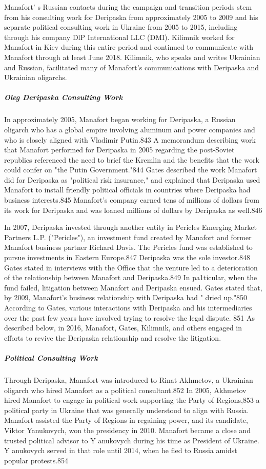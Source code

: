 Manafort' s  Russian contacts during the campaign and transition periods stem from his consulting work for Deripaska from approximately 2005 to 2009 and his separate political consulting work in Ukraine from 2005 to 2015, including through his company Dl\1P International LLC (DMI). Kilimnik worked for Manafort in Kiev during this entire period and continued to communicate with Manafort through at least June 2018. Kilimnik, who speaks and writes Ukrainian and Russian, facilitated many of Manafort's communications with Deripaska and Ukrainian oligarchs.

\subparagraph{Oleg Deripaska Consulting Work}

In approximately 2005, Manafort began working for Deripaska, a  Russian oligarch who has a  global empire involving aluminum and power companies and who is closely aligned with Vladimir Putin.843 A memorandum describing work that Manafort performed for Deripaska in 2005 regarding the post-Soviet republics referenced the need to brief the Kremlin and the benefits that the work could confer on "the Putin Government."844 Gates described the work Manafort did for Deripaska as "political risk insurance," and explained that Deripaska used Manafort to install friendly political officials in countries where Deripaska had business interests.845 Manafort's company earned tens of millions of dollars from its work for Deripaska and was loaned millions of dollars by Deripaska as well.846

In 2007, Deripaska invested through another entity in Pericles Emerging Market Partners L.P. ("Pericles"), an investment fund created by Manafort and former Manafort business partner Richard Davis. The Pericles fund was established to pursue investments in Eastern Europe.847 Deripaska was the sole investor.848 Gates stated in interviews with the Office that the venture led to a deterioration of the relationship between Manafort and Deripaska.849 In pa1ticular, when the fund failed, litigation between Manafort and Deripaska ensued. Gates stated that, by 2009, Manafort's business relationship with Deripaska had " dried up."850 According to Gates, various interactions with Deripaska and his intermediaries over the past few years have involved trying to resolve the legal dispute. 851 As described below, in 2016, Manafort, Gates, Kilimnik, and others engaged in efforts to revive the Deripaska relationship and resolve the litigation.

\subparagraph{Political Consulting Work}

Through Deripaska, Manafort was introduced to Rinat Akhmetov,  a  Ukrainian oligarch who hired Manafort as a  political consultant.852 In 2005, Akhmetov hired Manafort to engage in political work supporting the Party of Regions,853 a political party in Ukraine that was generally understood to align with Russia. Manafort assisted the Party of Regions in regaining power, and its candidate,  Viktor Yanukovych,  won the presidency in 2010. Manafort became a  close and trusted political advisor to Y anukovych during his time as President of Ukraine. Y anukovych served in that role until 2014, when he fled to Russia amidst popular protests.854

